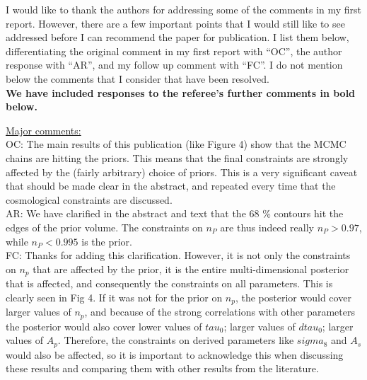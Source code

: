 \documentclass[12pt]{article}
\begin{document}
\onehalfspacing

I would like to thank the authors for addressing some of the comments in my first report.
However, there are a few important points that I would still like to see addressed before I can recommend the paper for publication.
I list them below, differentiating the original comment in my first report with “OC”, the author response with “AR”, and my follow up comment with “FC”.
I do not mention below the comments that I consider that have been resolved.\\

\textbf{We have included responses to the referee's further comments in bold below.}\\

\hrulefill \newline

\underline{Major comments:}\\

OC: The main results of this publication (like Figure 4) show that the MCMC chains are hitting the priors. This means that the final constraints are strongly affected by the (fairly arbitrary) choice of priors. This is a very significant caveat that should be made clear in the abstract, and repeated every time that the cosmological constraints are discussed.\\

AR: We have clarified in the abstract and text that the 68 \% contours hit the edges of the prior volume. The constraints on $n_P$ are thus indeed really $n_P > 0.97$, while $n_P < 0.995$ is the prior.\\

FC: Thanks for adding this clarification. However, it is not only the constraints on $n_p$ that are affected by the prior, it is the entire multi-dimensional posterior that is affected, and consequently the constraints on all parameters. This is clearly seen in Fig 4. If it was not for the prior on $n_p$, the posterior would cover larger values of $n_p$, and because of the strong correlations with other parameters the posterior would also cover lower values of $tau_0$; larger values of $dtau_0$; larger values of $A_p$. Therefore, the constraints on derived parameters like $sigma_8$ and $A_s$ would also be affected, so it is important to acknowledge this when discussing these results and comparing them with other results from the literature.\\
\end{document}
